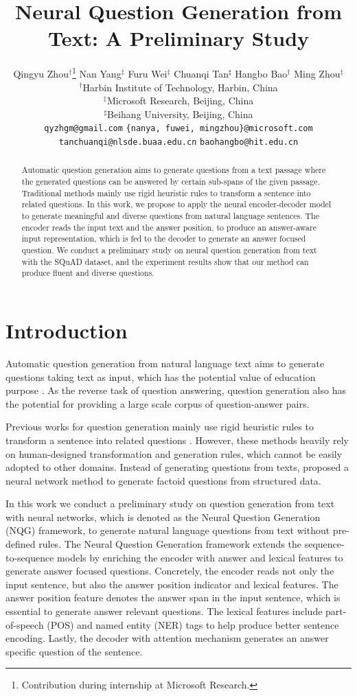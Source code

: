 \documentclass[11pt,letterpaper]{article}
\title{Neural Question Generation from Text: A Preliminary Study}
\author{Qingyu Zhou$^\dag$\thanks{\; Contribution during internship at Microsoft Research.} \hspace{0.15cm} Nan Yang$^\ddag$ \hspace{0.15cm} Furu Wei$^\ddag$ \hspace{0.15cm} Chuanqi Tan$^\sharp $ \hspace{0.15cm} Hangbo Bao$^\dag$ \hspace{0.15cm} Ming Zhou$^\ddag$ \\
	$^\dag$Harbin Institute of Technology, Harbin, China \\
	$^\ddag$Microsoft Research, Beijing, China \\
	$^\sharp $Beihang University, Beijing, China\\
	{\tt qyzhgm@gmail.com} \hspace{0.15cm} {\tt \{nanya, fuwei, mingzhou\}@microsoft.com}\\
{\tt tanchuanqi@nlsde.buaa.edu.cn} \hspace{0.15cm} {\tt baohangbo@hit.edu.cn}
}
\date{}
\begin{document}
\maketitle

\begin{abstract}
	Automatic question generation aims to generate questions from a text passage where the generated questions can be answered by certain sub-spans of the given passage.
	Traditional methods mainly use rigid heuristic rules to transform a sentence into related questions.
	In this work, we propose to apply the neural encoder-decoder model to generate meaningful and diverse questions from natural language sentences.
	The encoder reads the input text and the answer position, to produce an answer-aware input representation, which is fed to the decoder to generate an answer focused question.
	We conduct a preliminary study on neural question generation from text with the SQuAD dataset, and the experiment results show that our method can produce fluent and diverse questions.
\end{abstract}

\section{Introduction}

Automatic question generation  from natural language text aims to generate questions taking text as input, which has the potential value of education purpose \citep{heilman2011automatic}.
As the reverse task of question answering, question generation also has the potential for providing a large scale corpus of question-answer pairs.

Previous works for question generation mainly use rigid heuristic rules to transform a sentence into related questions \citep{heilman2011automatic, chali2015towards}.
However, these methods heavily rely on human-designed transformation and generation rules, which cannot be easily adopted to other domains.
Instead of generating questions from texts, \citet{serban-EtAl:2016:P16-1} proposed a neural network method to generate factoid questions from structured data.

In this work we conduct a preliminary study on question generation from text with neural networks, which is denoted as the Neural Question Generation  (NQG) framework, to generate natural language questions from text without pre-defined rules.
The Neural Question Generation framework extends the sequence-to-sequence models by enriching the encoder with answer and lexical  features to generate answer focused questions.
Concretely, the encoder reads not only the input sentence, but also the answer position indicator and lexical features.
The answer position feature denotes the answer span in the input sentence, which is essential to generate answer relevant questions.
The lexical features include part-of-speech (POS) and named entity (NER) tags to help produce better sentence encoding.
Lastly, the decoder with attention mechanism \cite{bahdanau2014neural} generates an answer specific question of the sentence.
\end{document}
